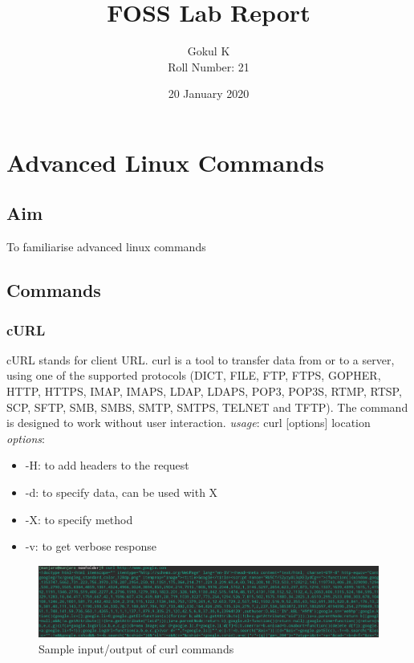 \documentclass{article}
\begin{document}
\title{FOSS Lab Report}
\author{Gokul K\\[2\baselineskip]
Roll Number: 21\\[2\baselineskip]}
\date{20 January 2020}

\maketitle

\section{Advanced Linux Commands}
\subsection{Aim}
To familiarise advanced linux commands
\subsection{Commands}
\subsubsection{cURL}
cURL stands for client URL. curl is a tool to transfer data from or to a server, using one of the supported protocols (DICT, FILE, FTP, FTPS, GOPHER, HTTP, HTTPS, IMAP, IMAPS, LDAP, LDAPS, POP3, POP3S, RTMP, RTSP, SCP, SFTP, SMB, SMBS, SMTP, SMTPS,
TELNET and TFTP). The command is designed to work without user interaction.\newline\newline
\hspace{\parindent} {\em usage}: curl [options] location
\newline
\hspace{\parindent} {\em options}:\newline
\begin{itemize}
    \item -H: to add headers to the request
    \item -d: to specify data, can be used with X
    \item -X: to specify method
    \item -v: to get verbose response
    
\end{itemize}
    
\begin{figure}
    \centering
    \includegraphics[width=.80\textwidth]{img/p3/ss1.png}
    \caption{Sample input/output of curl commands}
\end{figure}
\end{document}
